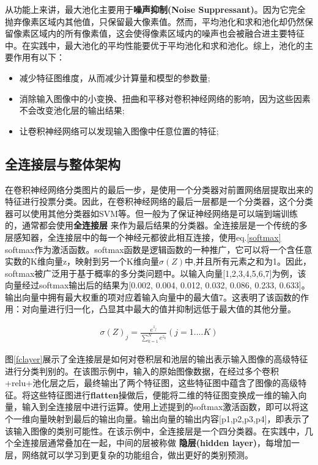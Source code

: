 从功能上来讲，最大池化主要用于\textbf{噪声抑制(Noise Suppressant)}。因为它完全抛弃像素区域内其他值，只保留最大像素值。然而，平均池化和求和池化却仍然保留像素区域内的所有像素值，这会使得像素区域内的噪声也会被融合进主要特征中。在实践中，最大池化的平均性能要优于平均池化和求和池化。综上，池化的主要作用有以下：

\begin{itemize}
	\item 减少特征图维度，从而减少计算量和模型的参数量;
	\item 消除输入图像中的小变换、扭曲和平移对卷积神经网络的影响，因为这些因素不会改变池化层的输出结果;
	\item 让卷积神经网络可以发现输入图像中任意位置的特征;
\end{itemize}

\subsection{全连接层与整体架构}
在卷积神经网络分类图片的最后一步，是使用一个分类器对前置网络层提取出来的特征进行投票分类。因此，在卷积神经网络的最后一层都是一个分类器，这个分类器可以使用其他分类器如SVM等。但一般为了保证神经网络是可以端到端训练的，通常都会使用\textbf{全连接层} 来作为最后结果的分类器。全连接层是一个传统的多层感知器，全连接层中的每一个神经元都彼此相互连接，使用eq.\ref{softmax} softmax作为激活函数。softmax函数是逻辑函数的一种推广，它可以将一个含任意实数的K维向量z，映射到另一个K维向量$\sigma (Z)$中,并且所有元素之和为1。因此，softmax被广泛用于基于概率的多分类问题中。以输入向量[1,2,3,4,5,6,7]为例，该向量经过softmax输出后的结果为[0.002, 0.004, 0.012, 0.032, 0.086, 0.233, 0.633]。输出向量中拥有最大权重的项对应着输入向量中的最大值7。这表明了该函数的作用：对向量进行归一化，凸显其中最大的值并抑制远低于最大值的其他分量。

\begin{equation}
\begin{aligned}
\label{softmax}
\sigma (Z)_j = \frac{e^{z_j}}{\sum_{k=1}^N e^{z_k}}  (j=1....K)
\end{aligned}
\end{equation}

图\ref{fclayer}展示了全连接层是如何对卷积层和池层的输出表示输入图像的高级特征进行分类判别的。在该图示例中，输入的原始图像数据，在经过多个卷积+relu+池化层之后，最终输出了两个特征图，这些特征图中蕴含了图像的高级特征。将这些特征图进行\textbf{flatten}操做后，便能将二维的特征图变换成一维的输入向量，输入到全连接层中进行运算。使用上述提到的softmax激活函数，即可以将这个一维向量映射到最后的输出向量。输出向量的输出内容[p1,p2,p3,p4]，即表示了该输入图像的类别可能性。在该示例中，全连接层是一个四分类器。在实践中，几个全连接层通常叠加在一起，中间的层被称做 \textbf{隐层(hidden layer)}，每增加一层，网络就可以学习到更复杂的功能组合，做出更好的类别预测。


